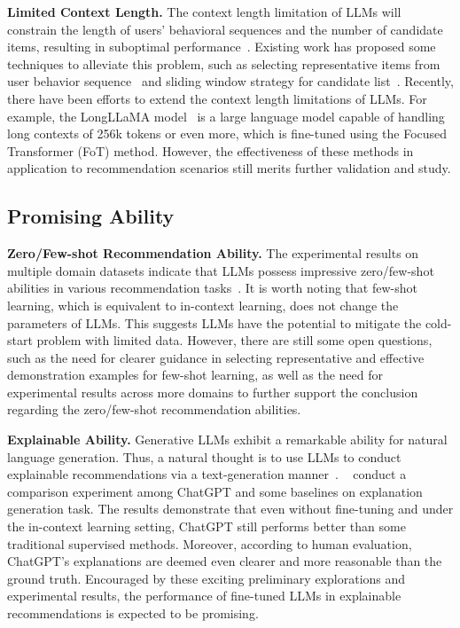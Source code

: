 \documentclass[sn-mathphys-num]{sn-jnl}%
\theoremstyle{thmstyleone}%
\theoremstyle{thmstyletwo}%
\theoremstyle{thmstylethree}%
\begin{document}
\noindent\textbf{Limited Context Length.}
The context length limitation of LLMs will constrain the length of users' behavioral sequences and the number of candidate items, resulting in suboptimal performance~\cite{DBLP:journals/corr/abs-2305-07001}.
Existing work has proposed some techniques to alleviate this problem, such as selecting representative items from user behavior sequence~\cite{DBLP:journals/corr/abs-2304-03153} and sliding window strategy for candidate list~\cite{DBLP:journals/corr/abs-2304-09542}.
Recently, there have been efforts to extend the context length limitations of LLMs. For example, the LongLLaMA model~\cite{tworkowski2023focused} is a large language model capable of handling long contexts of 256k tokens or even more, which is fine-tuned using the Focused Transformer (FoT) method.
However, the effectiveness of these methods in application to recommendation scenarios still merits further validation and study.




\subsection{Promising Ability}
\noindent\textbf{Zero/Few-shot Recommendation Ability.}
The experimental results on multiple domain datasets indicate that LLMs possess impressive zero/few-shot abilities in various recommendation tasks~\cite{DBLP:journals/corr/abs-2305-08845,DBLP:journals/corr/abs-2304-10149,DBLP:journals/corr/abs-2305-02182}.
It is worth noting that few-shot learning, which is equivalent to in-context learning, does not change the parameters of LLMs.
This suggests LLMs have the potential to mitigate the cold-start problem with limited data.
However, there are still some open questions, such as the need for clearer guidance in selecting representative and effective demonstration examples for few-shot learning, as well as the need for experimental results across more domains to further support the conclusion regarding the zero/few-shot recommendation abilities.


\noindent\textbf{Explainable Ability.}
Generative LLMs exhibit a remarkable ability for natural language generation.
Thus, a natural thought is to use LLMs to conduct explainable recommendations via a text-generation manner~\cite{silva2024leveraging,wang2024can}.
~\cite{DBLP:journals/corr/abs-2304-10149} conduct a comparison experiment among ChatGPT and some baselines on explanation generation task.
The results demonstrate that even without fine-tuning and under the in-context learning setting, ChatGPT still performs better than some traditional supervised methods.
Moreover, according to human evaluation, ChatGPT's explanations are deemed even clearer and more reasonable than the ground truth.
Encouraged by these exciting preliminary explorations and  experimental results, the performance of fine-tuned LLMs in explainable recommendations is expected to be promising.
\end{document}
